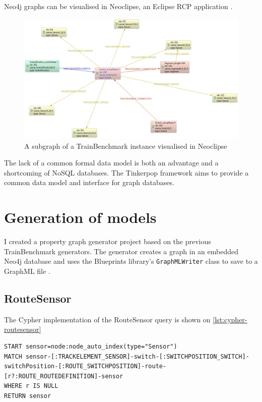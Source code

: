 Neo4j graphs can be visualised in Neoclipse, an Eclipse RCP application \cite{Neoclipse}.

\begin{figure}
\begin{center}
\includegraphics[width=14cm]{figures/neoclipse-graph}
\caption{A subgraph of a TrainBenchmark instance visualised in Neoclipse}
\label{fig:neoclipse}
\end{center}
\end{figure}

The lack of a common formal data model is both an advantage and a shortcoming of NoSQL databases. The Tinkerpop framework \cite{Tinkerpop} aims to provide a common data model and interface for graph databases.

\section{Generation of models}

I created a property graph generator project based on the previous TrainBenchmark generators. The generator creates a graph in an embedded Neo4j database and uses the Blueprints library's \texttt{GraphMLWriter} class to save to a GraphML file \cite{Blueprints}.

\subsection{RouteSensor}

The Cypher implementation of the RouteSensor query is shown on \autoref{lst:cypher-routesensor}

\begin{lstlisting}[caption=Cyper query for the RouteSensor test case, label=lst:cypher-routesensor, breaklines=true]
START sensor=node:node_auto_index(type="Sensor")
MATCH sensor-[:TRACKELEMENT_SENSOR]-switch-[:SWITCHPOSITION_SWITCH]-switchPosition-[:ROUTE_SWITCHPOSITION]-route-[r?:ROUTE_ROUTEDEFINITION]-sensor
WHERE r IS NULL
RETURN sensor
\end{lstlisting}

